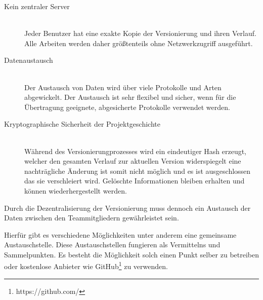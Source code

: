 \begin{description}

\item[Kein zentraler Server] \hfill \\

Jeder Benutzer hat eine exakte Kopie der Versionierung und ihren Verlauf. Alle Arbeiten werden daher größtenteils ohne Netzwerkzugriff ausgeführt.

\item[Datenaustausch] \hfill \\

Der Austausch von Daten wird über viele Protokolle und Arten abgewickelt. Der Austausch ist sehr flexibel und sicher, wenn für die Übertragung geeignete, abgesicherte Protokolle verwendet werden.

\item[Kryptographische Sicherheit der Projektgeschichte] \hfill \\

Während des Versionierungprozesses wird ein eindeutiger Hash erzeugt, welcher den gesamten Verlauf zur aktuellen Version widerspiegelt eine nachträgliche Änderung ist somit nicht möglich und es ist ausgeschlossen das sie verschleiert wird. Gelöschte Informationen bleiben erhalten und können wiederhergestellt werden.
\end{description}

Durch die Dezentralisierung der Versionierung muss dennoch ein Austausch der Daten zwischen den Teammitgliedern gewährleistet sein.

Hierfür gibt es verschiedene Möglichkeiten unter anderem eine gemeinsame Austauschstelle. Diese Austauschstellen fungieren als Vermittelns und Sammelpunkten. Es besteht die Möglichkeit solch einen Punkt selber zu betreiben oder kostenlose Anbieter wie GitHub\footnote{https://github.com/} zu verwenden.